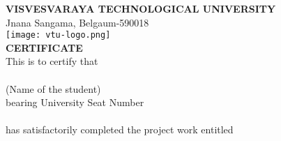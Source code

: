 \documentclass[12pt, a4paper]{report}
\begin{document}
\begin{titlepage}
\begin{center}
\textbf{{\large VISVESVARAYA TECHNOLOGICAL UNIVERSITY}}\\
{\normalsize Jnana Sangama, Belgaum-590018}\\
\vspace{0.5in}
\texttt{[image: vtu-logo.png]}\\
\vspace{0.5in}
\textbf{CERTIFICATE}\\
\vspace{0.3in}
This is to certify that \\
\vspace{0.2in}
\underline{\hspace{10cm}}\\
\vspace{0.2in}
(Name of the student)\\
\vspace{0.2in}
bearing University Seat Number \\
\vspace{0.2in}
\underline{\hspace{10cm}}\\
\vspace{0.2in}
has satisfactorily completed the project work entitled \\


\end{center}
\end{titlepage}
\end{document}
